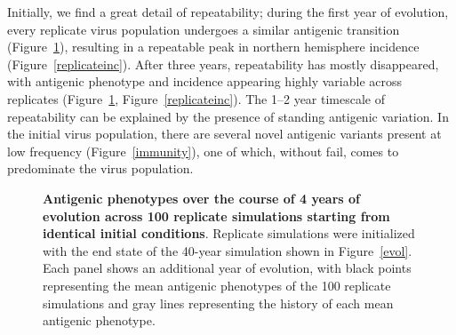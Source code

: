 \documentclass[11pt,oneside,letterpaper]{article}
\begin{document}
Initially, we find a great detail of repeatability; during the first year of evolution, every replicate virus population undergoes a similar antigenic transition (Figure~\ref{replicateevol}), resulting in a repeatable peak in northern hemisphere incidence (Figure~\ref{replicateinc}).  After three years, repeatability has mostly disappeared, with antigenic phenotype and incidence appearing highly variable across replicates (Figure~\ref{replicateevol}, Figure~\ref{replicateinc}).  The 1--2 year timescale of repeatability can be explained by the presence of standing antigenic variation.  In the initial virus population, there are several novel antigenic variants present at low frequency (Figure~\ref{immunity}), one of which, without fail, comes to predominate the virus population.  

\begin{figure}[tb]
	\centering
	\caption{\textbf{Antigenic phenotypes over the course of 4 years of evolution across 100 replicate simulations starting from identical initial conditions}.  Replicate simulations were initialized with the end state of the  40-year simulation shown in Figure~\ref{evol}.  Each panel shows an additional year of evolution, with black points representing the mean antigenic phenotypes of the 100 replicate simulations and gray lines representing the history of each mean antigenic phenotype.}
	\label{replicateevol}
\end{figure}
\end{document}
